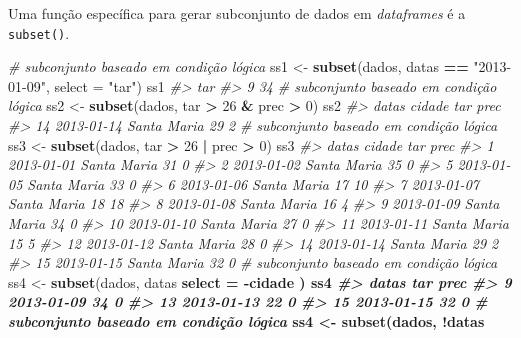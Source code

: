 \documentclass[]{book}
\newenvironment{Shaded}{\begin{snugshade}}{\end{snugshade}}
\newcommand{\KeywordTok}[1]{\textcolor[rgb]{0.13,0.29,0.53}{\textbf{#1}}}
\newcommand{\DataTypeTok}[1]{\textcolor[rgb]{0.13,0.29,0.53}{#1}}
\newcommand{\DecValTok}[1]{\textcolor[rgb]{0.00,0.00,0.81}{#1}}
\newcommand{\StringTok}[1]{\textcolor[rgb]{0.31,0.60,0.02}{#1}}
\newcommand{\CommentTok}[1]{\textcolor[rgb]{0.56,0.35,0.01}{\textit{#1}}}
\newcommand{\OperatorTok}[1]{\textcolor[rgb]{0.81,0.36,0.00}{\textbf{#1}}}
\newcommand{\NormalTok}[1]{#1}
\begin{document}
Uma função específica para gerar subconjunto de dados em
\emph{dataframes} é a \texttt{subset()}.

\begin{Shaded}
\begin{Highlighting}[]
\CommentTok{# subconjunto baseado em condição lógica}
\NormalTok{ss1 <-}\StringTok{ }\KeywordTok{subset}\NormalTok{(dados, datas }\OperatorTok{==}\StringTok{ "2013-01-09"}\NormalTok{, }\DataTypeTok{select =} \StringTok{"tar"}\NormalTok{)}
\NormalTok{ss1}
\CommentTok{#>   tar}
\CommentTok{#> 9  34}
\CommentTok{# subconjunto baseado em condição lógica}
\NormalTok{ss2 <-}\StringTok{ }\KeywordTok{subset}\NormalTok{(dados, tar }\OperatorTok{>}\StringTok{ }\DecValTok{26} \OperatorTok{&}\StringTok{ }\NormalTok{prec }\OperatorTok{>}\StringTok{ }\DecValTok{0}\NormalTok{)}
\NormalTok{ss2}
\CommentTok{#>         datas      cidade tar prec}
\CommentTok{#> 14 2013-01-14 Santa Maria  29    2}
\CommentTok{# subconjunto baseado em condição lógica}
\NormalTok{ss3 <-}\StringTok{ }\KeywordTok{subset}\NormalTok{(dados, tar }\OperatorTok{>}\StringTok{ }\DecValTok{26} \OperatorTok{|}\StringTok{ }\NormalTok{prec }\OperatorTok{>}\StringTok{ }\DecValTok{0}\NormalTok{)}
\NormalTok{ss3}
\CommentTok{#>         datas      cidade tar prec}
\CommentTok{#> 1  2013-01-01 Santa Maria  31    0}
\CommentTok{#> 2  2013-01-02 Santa Maria  35    0}
\CommentTok{#> 5  2013-01-05 Santa Maria  33    0}
\CommentTok{#> 6  2013-01-06 Santa Maria  17   10}
\CommentTok{#> 7  2013-01-07 Santa Maria  18   18}
\CommentTok{#> 8  2013-01-08 Santa Maria  16    4}
\CommentTok{#> 9  2013-01-09 Santa Maria  34    0}
\CommentTok{#> 10 2013-01-10 Santa Maria  27    0}
\CommentTok{#> 11 2013-01-11 Santa Maria  15    5}
\CommentTok{#> 12 2013-01-12 Santa Maria  28    0}
\CommentTok{#> 14 2013-01-14 Santa Maria  29    2}
\CommentTok{#> 15 2013-01-15 Santa Maria  32    0}
\CommentTok{# subconjunto baseado em condição lógica}
\NormalTok{ss4 <-}\StringTok{ }\KeywordTok{subset}\NormalTok{(dados,}
\NormalTok{  datas }\OperatorTok{%
  \DataTypeTok{select =} \OperatorTok{-}\NormalTok{cidade}
\NormalTok{)}
\NormalTok{ss4}
\CommentTok{#>         datas tar prec}
\CommentTok{#> 9  2013-01-09  34    0}
\CommentTok{#> 13 2013-01-13  22    0}
\CommentTok{#> 15 2013-01-15  32    0}
\CommentTok{# subconjunto baseado em condição lógica}
\NormalTok{ss4 <-}\StringTok{ }\KeywordTok{subset}\NormalTok{(dados,}
  \OperatorTok{!}\NormalTok{datas }\OperatorTok{%
}}
\end{Highlighting}
\end{Shaded}
\end{document}
